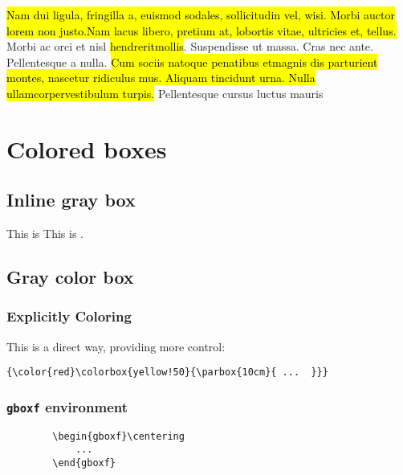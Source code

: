 \noindent \hl{Nam dui ligula, fringilla a, euismod sodales, sollicitudin vel, wisi. Morbi auctor lorem non justo.Nam lacus libero, pretium at, lobortis vitae, ultricies et, tellus.} Morbi ac orci et nisl \hl{hendreritmollis}. Suspendisse ut massa. Cras nec ante. Pellentesque a nulla. \hl{Cum sociis natoque penatibus etmagnis dis parturient montes, nascetur ridiculus mus. Aliquam tincidunt urna. Nulla ullamcorpervestibulum turpis.} Pellentesque cursus luctus mauris

\np
\section{Colored boxes} \label{sec:colored-box}

\subsection{Inline gray box}
This is {\color{blue}} \TO This is .


\subsection{Gray color box}\label{sec:gray-box}

\subsubsection{Explicitly Coloring}
This is a direct way, providing more control:
\begin{SBN}
\color{blue}
\begin{verbatim}
{\color{red}\colorbox{yellow!50}{\parbox{10cm}{ ...  }}}
\end{verbatim}
\end{SBN}

\subsubsection{\texttt{gboxf} environment}
\begin{SBN}
    \begin{verbatim}
    	\begin{gboxf}\centering
    		...
    	\end{gboxf}
    \end{verbatim}
\end{SBN}

